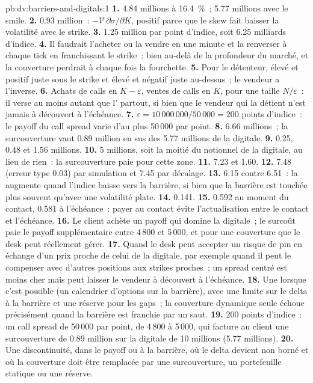 \begin{solution}{pb:dv:barriers-and-digitals:1}
\textbf{1.} 4.84 millions à 16.4~\%~; 5.77 millions avec le smile.
\textbf{2.} 0.93 million~: $-\mathcal V\,\partial\sigma/\partial K$, positif parce que le skew fait baisser la volatilité avec le
strike.
\textbf{3.} 1.25 million par point d'indice, soit 6.25 milliards d'indice.
\textbf{4.} Il faudrait l'acheter ou la vendre en une minute et la renverser à chaque tick en franchissant le strike~: bien au-delà
de la profondeur du marché, et la couverture perdrait à chaque fois la fourchette.
\textbf{5.} Pour le détenteur, élevé et positif juste sous le strike et élevé et négatif juste au-dessus~; le vendeur a
l'inverse.
\textbf{6.} Achats de calls en $K-\varepsilon$, ventes de calls en $K$, pour une taille $N/\varepsilon$~: il verse au moins autant que l' partout, si bien que le vendeur qui la détient n'est jamais à découvert à l'échéance.
\textbf{7.} $\varepsilon=10\,000\,000/50\,000=200$ points d'indice~: le payoff du call spread varie d'au plus 50\,000 par point.
\textbf{8.} 6.66 millions~; la surcouverture vaut 0.89 million en sus des 5.77 millions de la digitale.
\textbf{9.} 0.25, 0.48 et 1.56 millions.
\textbf{10.} 5 millions, soit la moitié du notionnel de la digitale, au lieu de rien~: la surcouverture paie pour cette zone.
\textbf{11.} 7.23 et 1.60.
\textbf{12.} 7.48 (erreur type 0.03) par simulation et 7.45 par décalage.
\textbf{13.} 6.15 contre 6.51~: la  augmente quand l'indice baisse vers la barrière, si bien que la barrière est touchée plus
souvent qu'avec une volatilité plate.
\textbf{14.} 0.141.
\textbf{15.} 0.592 au moment du contact, 0.581 à l'échéance~: payer au contact évite l'actualisation entre le contact et l'échéance.
\textbf{16.} Le client achète un payoff qui domine la digitale~; le surcoût paie le payoff supplémentaire entre
4\,800 et 5\,000, et pour une couverture que le desk peut réellement gérer.
\textbf{17.} Quand le desk peut accepter un risque de pin en échange d'un prix proche de celui de la digitale, par exemple quand il
peut le compenser avec d'autres positions aux strikes proches~; un spread centré est moins cher mais peut laisser le vendeur à découvert
à l'échéance.
\textbf{18.} Une  lorsque c'est possible (un calendrier d'options sur la barrière), avec une limite sur le delta à la barrière et une
réserve pour les gaps~; la couverture dynamique seule échoue précisément quand la barrière est franchie par un saut.
\textbf{19.} 200 points d'indice~: un call spread de 50\,000 par point, de 4\,800 à 5\,000, qui facture au client une
surcouverture de 0.89 million sur la digitale de 10 millions (5.77 millions).
\textbf{20.} Une discontinuité, dans le payoff ou à la barrière, où le delta devient non borné et où la couverture doit être
remplacée par une surcouverture, un portefeuille statique ou une réserve.
\end{solution}

